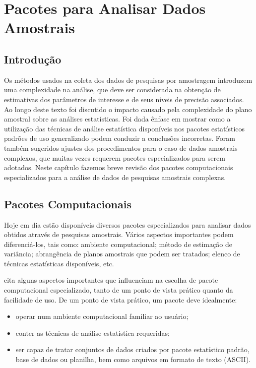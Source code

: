 \documentclass[]{book}
\theoremstyle{definition}
\theoremstyle{definition}
\theoremstyle{definition}
\theoremstyle{remark}
\begin{document}
\chapter{Pacotes para Analisar Dados Amostrais}\label{pacotes}

\section{Introdução}\label{introducao-8}

Os métodos usados na coleta dos dados de pesquisas por amostragem
introduzem uma complexidade na análise, que deve ser considerada na
obtenção de estimativas dos parâmetros de interesse e de seus níveis de
precisão associados. Ao longo deste texto foi discutido o impacto
causado pela complexidade do plano amostral sobre as análises
estatísticas. Foi dada ênfase em mostrar como a utilização das técnicas
de análise estatística disponíveis nos pacotes estatísticos padrões de
uso generalizado podem conduzir a conclusões incorretas. Foram também
sugeridos ajustes dos procedimentos para o caso de dados amostrais
complexos, que muitas vezes requerem pacotes especializados para serem
adotados. Neste capítulo fazemos breve revisão dos pacotes
computacionais especializados para a análise de dados de pesquisas
amostrais complexas.

\section{Pacotes Computacionais}\label{pacotes-computacionais}

Hoje em dia estão disponíveis diversos pacotes especializados para
analisar dados obtidos através de pesquisas amostrais. Vários aspectos
importantes podem diferenciá-los, tais como: ambiente computacional;
método de estimação de variância; abrangência de planos amostrais que
podem ser tratados; elenco de técnicas estatísticas disponíveis, etc.

\citep{carlson} cita alguns aspectos importantes que influenciam na
escolha de pacote computacional especializado, tanto de um ponto de
vista prático quanto da facilidade de uso. De um ponto de vista prático,
um pacote deve idealmente:

\begin{itemize}
\item
  operar num ambiente computacional familiar ao usuário;
\item
  conter as técnicas de análise estatística requeridas;
\item
  ser capaz de tratar conjuntos de dados criados por pacote estatístico
  padrão, base de dados ou planilha, bem como arquivos em formato de
  texto (ASCII).
\end{itemize}
\end{document}
